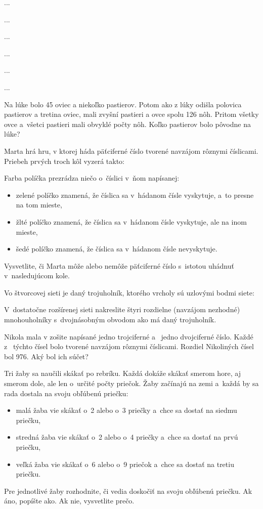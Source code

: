 ﻿{%
...}

{%
...}

{%
...}

{%
...}

{%
...}

{%
...}

{%
Na lúke bolo 45 oviec a niekoľko pastierov.
Potom ako z lúky odišla polovica pastierov a tretina oviec, mali zvyšní pastieri a ovce spolu 126 nôh.
Pritom všetky ovce a~všetci pastieri mali obvyklé počty nôh.
Koľko pastierov bolo pôvodne na lúke?}

{%
Marta hrá hru, v ktorej háda päťciferné číslo tvorené navzájom rôznymi číslicami.
Priebeh prvých troch kôl vyzerá takto:
%

Farba políčka prezrádza niečo o~číslici v~ňom napísanej:
\begin{itemize}
\item zelené políčko znamená, že číslica sa v~hádanom čísle vyskytuje, a~to presne na tom mieste,
\item žlté políčko znamená, že číslica sa v~hádanom čísle vyskytuje, ale na inom mieste,
\item šedé políčko znamená, že číslica sa v~hádanom čísle nevyskytuje.
\end{itemize}
Vysvetlite, či Marta môže alebo nemôže päťciferné číslo s~istotou uhádnuť v~nasledujúcom kole.}

{%
Vo štvorcovej sieti je daný trojuholník, ktorého vrcholy sú uzlovými bodmi siete:
%

V~dostatočne rozšírenej sieti nakreslite štyri rozdielne (navzájom nezhodné) mnohouholníky s~dvojnásobným obvodom ako má daný trojuholník.}

{%
Nikola mala v zošite napísané jedno trojciferné a~ jedno dvojciferné číslo.
Každé z~ týchto čísel bolo tvorené navzájom rôznymi číslicami.
Rozdiel Nikoliných čísel bol 976.
Aký bol ich súčet?}

{%
Tri žaby sa naučili skákať po rebríku.
Každá dokáže skákať smerom hore, aj smerom dole, ale len o~určité počty priečok.
Žaby začínajú na zemi a~každá by sa rada dostala na svoju obľúbenú priečku:
\begin{itemize}
\item malá žaba vie skákať o~2 alebo o~3 priečky a~chce sa dostať na siedmu priečku,
\item stredná žaba vie skákať o~2 alebo o~4 priečky a~chce sa dostať na prvú priečku,
\item veľká žaba vie skákať o~6 alebo o~9 priečok a~chce sa dostať na tretiu priečku.
\end{itemize}
Pre jednotlivé žaby rozhodnite, či vedia doskočiť na svoju obľúbenú priečku.
Ak áno, popíšte ako.
Ak nie, vysvetlite prečo.}

